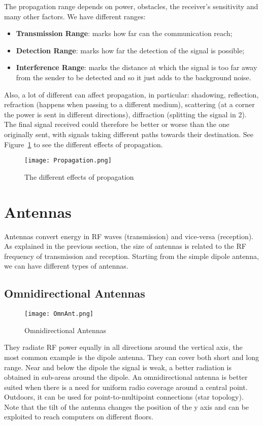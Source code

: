 The propagation range depends on power, obstacles, the receiver's 
sensitivity and many other factors. We have different ranges:
\begin{itemize}
\item \textbf{Transmission Range}: marks how far can the communication 
  reach;
\item \textbf{Detection Range}: marks how far the detection of the signal 
  is possible;
\item \textbf{Interference Range}: marks the distance at which the signal 
  is too far away from the sender to be detected and so it just adds to the 
  background noise.
\end{itemize}
Also, a lot of different  can affect propagation, in 
particular: shadowing, reflection, refraction (happens when passing to a 
different medium), scattering (at a corner the power is sent in different 
directions), diffraction (splitting the signal in 2).
The final signal received could therefore be better or worse than the 
one originally sent, with signals taking different paths towards their 
destination. See Figure~\ref{fig:ewn:Propagation} to see the different effects 
of propagation.

\begin{figure}[h]
  \centering
  \texttt{[image: Propagation.png]}
  \caption{The different effects of propagation}
  \label{fig:ewn:Propagation}
\end{figure}

\section{Antennas}
Antennas convert energy in RF waves (transmission) and vice-versa 
(reception). As explained in the previous section, the size of antennas is 
related to the RF frequency of transmission and reception.
Starting from the simple dipole antenna, we can have different types of 
antennas.

\subsection{Omnidirectional Antennas}
\begin{figure}[t]
  \centering
  \texttt{[image: OmnAnt.png]}
  \caption{Omnidirectional Antennas}				
  \label{fig:ewn:OmnAnt}
\end{figure}
They radiate RF power equally in all directions around the vertical axis, the
most common example is the dipole antenna. They can cover both short and long
range.
Near and below the dipole the signal is weak, a better radiation is 
obtained in sub-areas around the dipole. An omnidirectional antenna is better 
suited when there is a need for uniform radio coverage around a central point. 
Outdoors, it can be used for point-to-multipoint connections (star topology). 
Note that the tilt of the antenna changes the position of the y axis and can be 
exploited to reach computers on different floors.

